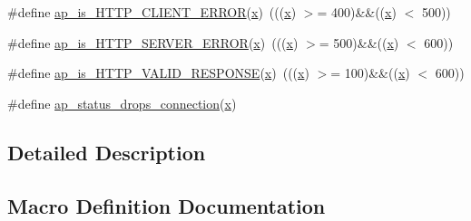 \begin{DoxyCompactItemize}
\item 
\#define \hyperlink{group__HTTP__Status_ga9374b8956cdc91a639d79bd5fd665470}{ap\+\_\+is\+\_\+\+H\+T\+T\+P\+\_\+\+C\+L\+I\+E\+N\+T\+\_\+\+E\+R\+R\+OR}(\hyperlink{pcregrep_8txt_a4242e9148f20c002763bf4ba53b26ad6}{x})~(((\hyperlink{pcregrep_8txt_a4242e9148f20c002763bf4ba53b26ad6}{x}) $>$= 400)\&\&((\hyperlink{pcregrep_8txt_a4242e9148f20c002763bf4ba53b26ad6}{x}) $<$ 500))
\item 
\#define \hyperlink{group__HTTP__Status_gafb5ccb26d1e82a2ccee5cabcf0eecd46}{ap\+\_\+is\+\_\+\+H\+T\+T\+P\+\_\+\+S\+E\+R\+V\+E\+R\+\_\+\+E\+R\+R\+OR}(\hyperlink{pcregrep_8txt_a4242e9148f20c002763bf4ba53b26ad6}{x})~(((\hyperlink{pcregrep_8txt_a4242e9148f20c002763bf4ba53b26ad6}{x}) $>$= 500)\&\&((\hyperlink{pcregrep_8txt_a4242e9148f20c002763bf4ba53b26ad6}{x}) $<$ 600))
\item 
\#define \hyperlink{group__HTTP__Status_ga0cdd763b32bf9c0f42e7da2eccf539ac}{ap\+\_\+is\+\_\+\+H\+T\+T\+P\+\_\+\+V\+A\+L\+I\+D\+\_\+\+R\+E\+S\+P\+O\+N\+SE}(\hyperlink{pcregrep_8txt_a4242e9148f20c002763bf4ba53b26ad6}{x})~(((\hyperlink{pcregrep_8txt_a4242e9148f20c002763bf4ba53b26ad6}{x}) $>$= 100)\&\&((\hyperlink{pcregrep_8txt_a4242e9148f20c002763bf4ba53b26ad6}{x}) $<$ 600))
\item 
\#define \hyperlink{group__HTTP__Status_gaf6029c20b468032acad1f82c4806ac6f}{ap\+\_\+status\+\_\+drops\+\_\+connection}(\hyperlink{pcregrep_8txt_a4242e9148f20c002763bf4ba53b26ad6}{x})
\end{DoxyCompactItemize}


\subsection{Detailed Description}


\subsection{Macro Definition Documentation}

